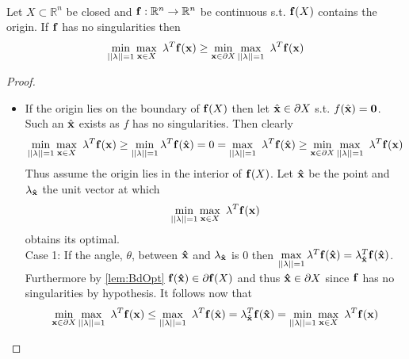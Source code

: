\begin{thm} \ \\
\label{thm:MainIneq}
Let $X\subset\mathbb{R}^n$ be closed and $\bold{f}:\mathbb{R}^n\rightarrow\mathbb{R}^n$ be continuous s.t. $\bold{f}(X)$ contains the origin. 
If $\bold{f}$ has no singularities then $$\min\limits_{||\bold{\lambda}||=1}\max\limits_{\bold x\in X}\ \bold{\lambda}^T\bold{f}(\bold x)\geq \min\limits_{\bold x\in \partial X}\max\limits_{||\bold{\lambda}||=1}\ \bold{\lambda}^T\bold{f}(\bold x)$$
\begin{proof} \ \\
\begin{itemize}
\item[] If the origin lies on the boundary of $\bold{f}(X)$ then let $\hat{\bold x}\in \partial X$ s.t. $f(\hat{\bold x})=\textbf{0}$. 
Such an $\hat{\bold x}$ exists as $f$ has no singularities. 
Then  clearly $$\min\limits_{||\bold{\lambda}||=1}\max\limits_{\bold x\in X}\ \bold{\lambda}^T\bold{f}(\bold x)\geq \min\limits_{||\bold{\lambda}||=1}\bold{\lambda}^T\bold{f}(\hat{\bold x})= 0 = \max\limits_{||\bold{\lambda}||=1}\ \bold{\lambda}^T\bold{f}(\hat{\bold x}) \geq \min\limits_{\bold x\in \partial X}\max\limits_{||\bold{\lambda}||=1}\ \bold{\lambda}^T\bold{f}(\bold x)$$
Thus assume the origin lies in the interior of $\bold{f}(X)$.
Let $\bold{\hat{x}}$ be the point and $\bold{\lambda}_{\bold{\hat{x}}}$ the unit vector at which $$\min\limits_{||\bold{\lambda}||=1}\max\limits_{\bold x\in X}\ \bold{\lambda}^T\bold{f}(\bold x)$$
obtains its optimal. \\

Case 1: If the angle, $\theta$, between $\bold{\hat{x}}$ and $\bold{\lambda}_{\bold{\hat{x}}}$ is 0 then $\max\limits_{||\bold{\lambda}||=1}\bold{\lambda}^T\bold{f}(\bold{\hat{x}})=\bold{\lambda}_{\bold{\hat{x}}}^T\bold{f}(\bold{\hat{x}})$. 
Furthermore by \cref{lem:BdOpt} $\bold{f}(\bold{\hat{x}})\in \partial \bold{f}(X)$ and thus $\bold{\hat{x}}\in \partial X$ since $\bold{f}$ has no singularities by hypothesis. 
It follows now that $$\min\limits_{\bold x\in \partial X}\max\limits_{||\bold{\lambda}||=1}\ \bold{\lambda}^T\bold{f}(\bold x)\leq \max\limits_{||\bold{\lambda}||=1}\ \bold{\lambda}^T\bold{f}(\hat{\bold x})=\bold{\lambda}_{\bold{\hat{x}}}^T\bold{f}(\bold{\hat{x}})=\min\limits_{||\bold{\lambda}||=1}\max\limits_{\bold x\in X}\ \bold{\lambda}^T\bold{f}(\bold x)$$


\end{itemize}
\end{proof}
\end{thm}
